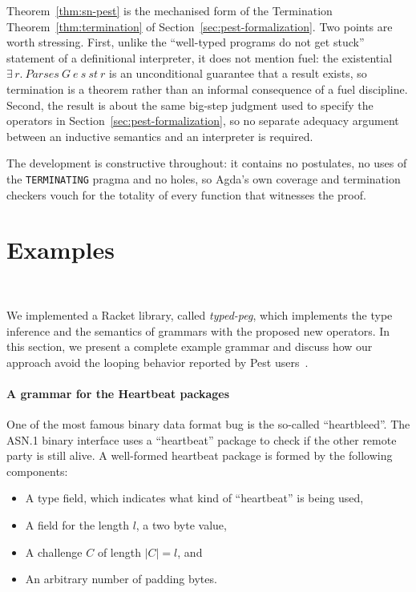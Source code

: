 \documentclass[preprint,12pt]{elsarticle}
\theoremstyle{definition}
\begin{document}
Theorem~\ref{thm:sn-pest} is the mechanised form of the Termination
Theorem~\ref{thm:termination} of Section~\ref{sec:pest-formalization}. Two points
are worth stressing. First, unlike the ``well-typed programs do not get stuck''
statement of a definitional interpreter, it does
not mention fuel: the existential $\exists\,r.\ \mathit{Parses}\ G\ e\ s\ st\ r$
is an unconditional guarantee that a result exists, so termination is a theorem
rather than an informal consequence of a fuel discipline. Second, the result is
about the same big-step judgment used to specify the operators in
Section~\ref{sec:pest-formalization}, so no separate adequacy argument between an
inductive semantics and an interpreter is required.

The development is constructive throughout: it contains no postulates, no uses of
the \lstinline{TERMINATING} pragma and no holes, so Agda's own coverage and
termination checkers vouch for the totality of every function that witnesses the
proof.
\section{Examples}~\label{sec:examples}

We implemented a Racket library, called \emph{typed-peg},
which implements the type inference and the semantics of grammars with the proposed new
operators. In this section, we present a complete example grammar and discuss how
our approach avoid the looping behavior reported by Pest users~\cite{PESTBUG}.

\paragraph{A grammar for the Heartbeat packages} One of the most famous binary data format
bug is the so-called ``heartbleed''. The ASN.1 binary interface uses a ``heartbeat''
package to check if the other remote party is still alive. A well-formed heartbeat package
is formed by the following components:
\begin{itemize}
  \item A type field, which indicates what kind of ``heartbeat'' is being used,
  \item A field for the length $l$, a two byte value,
  \item A challenge $C$ of length $|C| = l$, and
  \item An arbitrary number of padding bytes.
\end{itemize}
\end{document}
